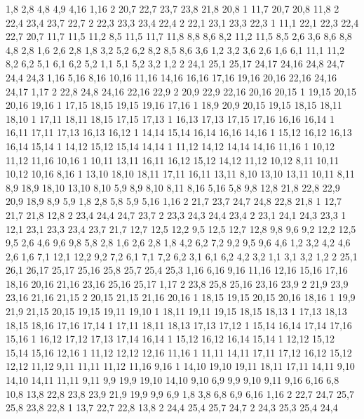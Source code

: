 1,8
2,8
4,8
4,9
4,16
1,16
2%
20,7
22,7
23,7
23,8
21,8
20,8
1%
11,7
20,7
20,8
11,8
2%
22,4
23,4
23,7
22,7
2%
22,3
23,3
23,4
22,4
2%
22,1
23,1
23,3
22,3
1%
11,1
22,1
22,3
22,4
22,7
20,7
11,7
11,5
11,2
%
8,5
11,5
11,7
11,8
8,8
8,6
%
8,2
11,2
11,5
8,5
%
2,6
3,6
8,6
8,8
4,8
2,8
%
1,6
2,6
2,8
1,8
%
3,2
5,2
6,2
8,2
8,5
8,6
3,6
%
1,2
3,2
3,6
2,6
1,6
%
6,1
11,1
11,2
8,2
6,2
%
5,1
6,1
6,2
5,2
%
1,1
5,1
5,2
3,2
1,2
2%
24,1
25,1
25,17
24,17
24,16
24,8
24,7
24,4
24,3
%
1,16
5,16
8,16
10,16
11,16
14,16
16,16
17,16
19,16
20,16
22,16
24,16
24,17
1,17
2%
22,8
24,8
24,16
22,16
22,9
2%
20,9
22,9
22,16
20,16
20,15
1%
19,15
20,15
20,16
19,16
1%
17,15
18,15
19,15
19,16
17,16
1%
18,9
20,9
20,15
19,15
18,15
18,11
18,10
1%
17,11
18,11
18,15
17,15
17,13
1%
16,13
17,13
17,15
17,16
16,16
16,14
1%
16,11
17,11
17,13
16,13
16,12
1%
14,14
15,14
16,14
16,16
14,16
1%
15,12
16,12
16,13
16,14
15,14
1%
14,12
15,12
15,14
14,14
1%
11,12
14,12
14,14
14,16
11,16
1%
10,12
11,12
11,16
10,16
1%
10,11
13,11
16,11
16,12
15,12
14,12
11,12
10,12
%
8,11
10,11
10,12
10,16
8,16
1%
13,10
18,10
18,11
17,11
16,11
13,11
%
8,10
13,10
13,11
10,11
8,11
%
8,9
18,9
18,10
13,10
8,10
%
5,9
8,9
8,10
8,11
8,16
5,16
%
5,8
9,8
12,8
21,8
22,8
22,9
20,9
18,9
8,9
5,9
%
1,8
2,8
5,8
5,9
5,16
1,16
2%
21,7
23,7
24,7
24,8
22,8
21,8
1%
12,7
21,7
21,8
12,8
2%
23,4
24,4
24,7
23,7
2%
23,3
24,3
24,4
23,4
2%
23,1
24,1
24,3
23,3
1%
12,1
23,1
23,3
23,4
23,7
21,7
12,7
12,5
12,2
%
9,5
12,5
12,7
12,8
9,8
9,6
%
9,2
12,2
12,5
9,5
%
2,6
4,6
9,6
9,8
5,8
2,8
%
1,6
2,6
2,8
1,8
%
4,2
6,2
7,2
9,2
9,5
9,6
4,6
%
1,2
3,2
4,2
4,6
2,6
1,6
%
7,1
12,1
12,2
9,2
7,2
%
6,1
7,1
7,2
6,2
%
3,1
6,1
6,2
4,2
3,2
%
1,1
3,1
3,2
1,2
2%
25,1
26,1
26,17
25,17
25,16
25,8
25,7
25,4
25,3
%
1,16
6,16
9,16
11,16
12,16
15,16
17,16
18,16
20,16
21,16
23,16
25,16
25,17
1,17
2%
23,8
25,8
25,16
23,16
23,9
2%
21,9
23,9
23,16
21,16
21,15
2%
20,15
21,15
21,16
20,16
1%
18,15
19,15
20,15
20,16
18,16
1%
19,9
21,9
21,15
20,15
19,15
19,11
19,10
1%
18,11
19,11
19,15
18,15
18,13
1%
17,13
18,13
18,15
18,16
17,16
17,14
1%
17,11
18,11
18,13
17,13
17,12
1%
15,14
16,14
17,14
17,16
15,16
1%
16,12
17,12
17,13
17,14
16,14
1%
15,12
16,12
16,14
15,14
1%
12,12
15,12
15,14
15,16
12,16
1%
11,12
12,12
12,16
11,16
1%
11,11
14,11
17,11
17,12
16,12
15,12
12,12
11,12
%
9,11
11,11
11,12
11,16
9,16
1%
14,10
19,10
19,11
18,11
17,11
14,11
%
9,10
14,10
14,11
11,11
9,11
%
9,9
19,9
19,10
14,10
9,10
%
6,9
9,9
9,10
9,11
9,16
6,16
%
6,8
10,8
13,8
22,8
23,8
23,9
21,9
19,9
9,9
6,9
%
1,8
3,8
6,8
6,9
6,16
1,16
2%
22,7
24,7
25,7
25,8
23,8
22,8
1%
13,7
22,7
22,8
13,8
2%
24,4
25,4
25,7
24,7
2%
24,3
25,3
25,4
24,4
